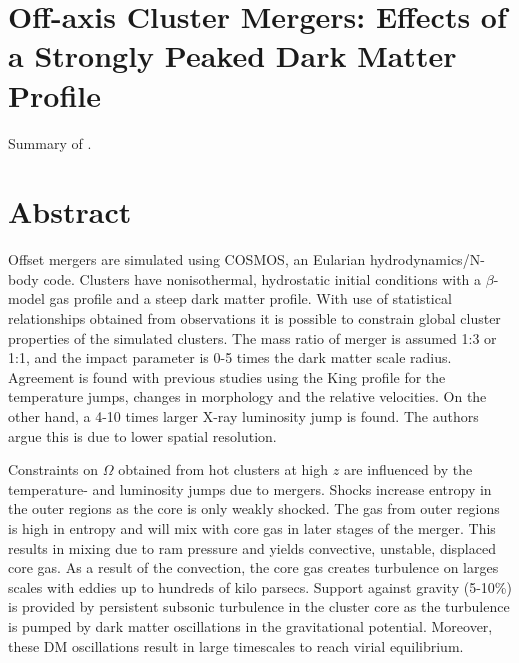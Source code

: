 \documentclass[MScProj_TLRH_ClusterEnergy.tex]{subfiles}
\begin{document}
\section*{Off-axis Cluster Mergers: Effects of a Strongly Peaked Dark Matter Profile}
\label{sec:SarazinRicker2001}
Summary of \citet{2001ApJ...561..621R}.
\\
\section*{Abstract}
Offset mergers are simulated using COSMOS, an Eularian hydrodynamics/N-body code. Clusters have nonisothermal, hydrostatic initial conditions with a $\beta$-model gas profile and a steep dark matter profile. With use of statistical relationships obtained from observations it is possible to constrain global cluster properties of the simulated clusters. The mass ratio of merger is assumed 1:3 or 1:1, and the impact parameter is 0-5 times the dark matter scale radius. Agreement is found with previous studies using the King profile for the temperature jumps, changes in morphology and the relative velocities. On the other hand, a 4-10 times larger X-ray luminosity jump is found. The authors argue this is due to lower spatial resolution.

Constraints on $\Omega$ obtained from hot clusters at high $z$ are influenced by the temperature- and luminosity jumps due to mergers. Shocks increase entropy in the outer regions as the core is only weakly shocked. The gas from outer regions is high in entropy and will mix with core gas in later stages of the merger. This results in mixing due to ram pressure and yields convective, unstable, displaced core gas. As a result of the convection, the core gas creates turbulence on larges scales with eddies up to hundreds of kilo parsecs. Support against gravity (5-10\%) is provided by persistent subsonic turbulence in the cluster core as the turbulence is pumped by dark matter oscillations in the gravitational potential. Moreover, these DM oscillations result in large timescales to reach virial equilibrium.




\SubfileBibliography
\end{document}
